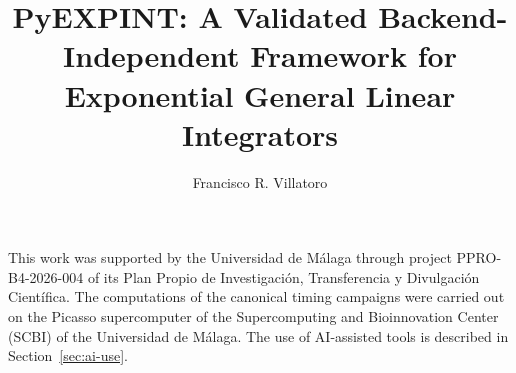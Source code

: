 \documentclass[acmsmall,review]{acmart}
\title{PyEXPINT: A Validated Backend-Independent Framework for Exponential General Linear Integrators}
\author{Francisco R. Villatoro}
\affiliation{%
  \institution{Escuela de Ingenier\'ias Industriales, Universidad de M\'alaga}
  \city{M\'alaga}
  \country{Spain}}
\begin{document}
\maketitle


\FloatBarrier

\FloatBarrier

\FloatBarrier

\FloatBarrier

\FloatBarrier

\FloatBarrier

\FloatBarrier
\clearpage

\FloatBarrier

\FloatBarrier


\begin{acks}
This work was supported by the Universidad de M\'alaga through project PPRO-B4-2026-004 of its Plan Propio de Investigaci\'on, Transferencia y Divulgaci\'on Cient\'ifica. The computations of the canonical timing campaigns were carried out on the Picasso supercomputer of the Supercomputing and Bioinnovation Center (SCBI) of the Universidad de M\'alaga. The use of AI-assisted tools is described in Section~\ref{sec:ai-use}.
\end{acks}



\end{document}
